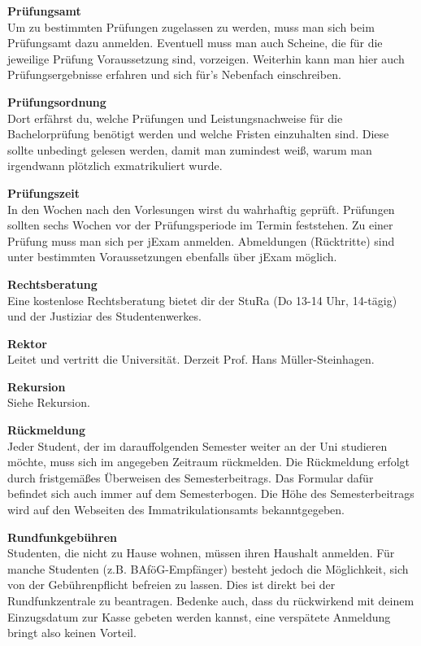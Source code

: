 \textbf{Prüfungsamt} \\
Um zu bestimmten Prüfungen zugelassen zu werden, muss man sich beim Prüfungsamt dazu anmelden.
Eventuell muss man auch Scheine, die für die jeweilige Prüfung Voraussetzung sind, vorzeigen.
Weiterhin kann man hier auch Prüfungsergebnisse erfahren und sich für's Nebenfach einschreiben.

\textbf{Prüfungsordnung} \\
Dort erfährst du, welche Prüfungen und Leistungsnachweise für die Bachelorprüfung benötigt werden und welche Fristen einzuhalten sind.
Diese sollte unbedingt gelesen werden, damit man zumindest weiß, warum man irgendwann plötzlich exmatrikuliert wurde.

\textbf{Prüfungszeit} \\
In den Wochen nach den Vorlesungen wirst du wahrhaftig geprüft.
Prüfungen sollten sechs Wochen vor der Prüfungsperiode im Termin feststehen.
Zu einer Prüfung muss man sich per jExam anmelden.
Abmeldungen (Rücktritte) sind unter bestimmten Voraussetzungen ebenfalls über jExam möglich.

\textbf{Rechtsberatung} \\
Eine kostenlose Rechtsberatung bietet dir der StuRa (Do 13-14 Uhr, 14-tägig) und der Justiziar des Studentenwerkes.

\textbf{Rektor} \\
Leitet und vertritt die Universität.
Derzeit Prof. Hans Müller-Steinhagen.

\textbf{Rekursion} \\
Siehe Rekursion.

\textbf{Rückmeldung} \\
Jeder Student, der im darauffolgenden Semester weiter an der Uni studieren möchte, muss sich im angegeben Zeitraum rückmelden.
Die Rückmeldung erfolgt durch fristgemäßes Überweisen des Semesterbeitrags.
Das Formular dafür befindet sich auch immer auf dem Semesterbogen.
Die Höhe des Semesterbeitrags wird auf den Webseiten des Immatrikulationsamts bekanntgegeben.

\textbf{Rundfunkgebühren} \\
Studenten, die nicht zu Hause wohnen, müssen ihren Haushalt anmelden.
Für manche Studenten (z.B. BAföG-Empfänger) besteht jedoch die Möglichkeit, sich von der Gebührenpflicht befreien zu lassen.
Dies ist direkt bei der Rundfunkzentrale zu beantragen.
Bedenke auch, dass du rückwirkend mit deinem Einzugsdatum zur Kasse gebeten werden kannst, eine verspätete Anmeldung bringt also keinen Vorteil.

